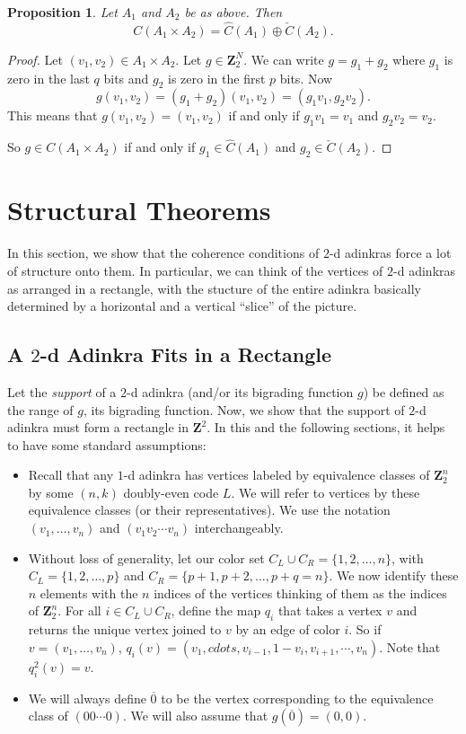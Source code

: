 \documentclass[12pt,twoside,singlespace]{article}
\numberwithin{equation}{section}
\newtheorem{prop}[equation]{Proposition}
\theoremstyle{definition}
\newcommand{\ZZ}{\mathbf{Z}}
\begin{document}
\begin{prop}
Let $A_1$ and $A_2$ be as above.  Then
\[C(A_1\times A_2)=\hat{C}(A_1)\oplus \check{C}(A_2).\]
\end{prop}
\begin{proof}
Let $(v_1,v_2)\in A_1\times A_2$.  Let $g\in \ZZ_2^N$.  We can write $g=g_1+g_2$ where $g_1$ is zero in the last $q$ bits and $g_2$ is zero in the first $p$ bits.  Now
\[g(v_1,v_2)=(g_1+g_2)(v_1,v_2)=(g_1v_1,g_2v_2).\]
This means that $g(v_1,v_2)=(v_1,v_2)$ if and only if $g_1v_1=v_1$ and $g_2 v_2=v_2$.

So $g\in C(A_1\times A_2)$ if and only if $g_1\in \hat{C}(A_1)$ and $g_2\in \check{C}(A_2)$.
\end{proof}



\section{Structural Theorems}

In this section, we show that the coherence conditions of $2$-d adinkras force a lot of structure onto them. In particular, we can think of the vertices of $2$-d adinkras as arranged in a rectangle, with the stucture of the entire adinkra basically determined by a horizontal and a vertical ``slice'' of the picture.

\subsection{A $2$-d Adinkra Fits in a Rectangle}

Let the \emph{support} of a $2$-d adinkra (and/or its bigrading function $g$) be defined as the range of $g$, its bigrading function. Now, we show that the support of $2$-d adinkra must form a rectangle in $\ZZ^2$. In this and the following sections, it helps to have some standard assumptions:

\begin{itemize}
\item Recall that any $1$-d adinkra has vertices labeled by equivalence classes of $\ZZ_2^n$ by some $(n,k)$ doubly-even code $L$. We will refer to vertices by these equivalence classes (or their representatives). We use the notation $(v_1, \ldots, v_n)$ and $(v_1 v_2 \cdots v_n)$ interchangeably.
\item Without loss of generality, let our color set $C_L \cup C_R = \{1,2,\ldots, n\}$, with $C_L = \{1, 2, \ldots, p\}$ and $C_R = \{p+1, p+2, \ldots, p+q=n\}$. We now identify these $n$ elements with the $n$ indices of the vertices thinking of them as the indices of $\ZZ_2^n$. For all $i \in C_L \cup C_R$, define the map $q_i$ that takes a vertex $v$ and returns the unique vertex joined to $v$ by an edge of color $i$. So if $v = (v_1, \ldots, v_n)$, $q_i(v) = (v_1, cdots, v_{i-1}, 1-v_i, v_{i+1}, \cdots, v_n)$. Note that $q_i^2(v) = v$.
\item We will always define $\overline{0}$ to be the vertex corresponding to the equivalence class of $(00\cdots0)$. We will also assume that $g(\overline{0}) = (0,0)$. 
\end{itemize}
\end{document}
